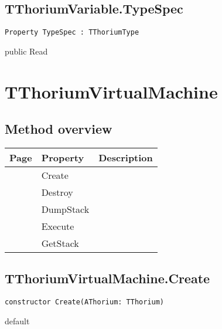 \subsection{TThoriumVariable.TypeSpec}
\label{thoriumcore:thorium:tthoriumvariable:typespec}
\begin{FPCList}
\Synopsis
\Declaration 

\begin{verbatim}
Property TypeSpec : TThoriumType
\end{verbatim}
\Visibility
public
\Access
Read
\Description
\end{FPCList}
\section{TThoriumVirtualMachine}
\label{thoriumcore:thorium:tthoriumvirtualmachine}
\subsection{Method overview}
\label{thoriumcore:thorium:tthoriumvirtualmachine:methods}
\begin{tabularx}{\textwidth}{llX}
Page & Property & Description  \\ \hline
\pageref{thoriumcore:thorium:tthoriumvirtualmachine:create} & Create  &  \\
\pageref{thoriumcore:thorium:tthoriumvirtualmachine:destroy} & Destroy  &  \\
\pageref{thoriumcore:thorium:tthoriumvirtualmachine:dumpstack} & DumpStack  &  \\
\pageref{thoriumcore:thorium:tthoriumvirtualmachine:execute} & Execute  &  \\
\pageref{thoriumcore:thorium:tthoriumvirtualmachine:getstack} & GetStack  &  \\
\hline
\end{tabularx}
\subsection{TThoriumVirtualMachine.Create}
\label{thoriumcore:thorium:tthoriumvirtualmachine:create}
\begin{FPCList}
\Synopsis
\Declaration 

\begin{verbatim}
constructor Create(AThorium: TThorium)
\end{verbatim}
\Visibility
default
\Description
\Errors
\end{FPCList}
